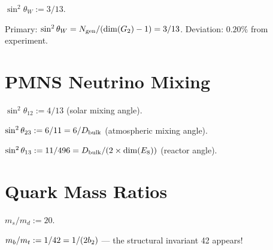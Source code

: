 \begin{definition}\label{def:sin2_theta_W_obs}
    \leanok
    $\sin^2\theta_W := 3/13$.
\end{definition}

\begin{theorem}\label{thm:sin2_theta_W_14}
    \leanok
    Primary: $\sin^2\theta_W = N_{\mathrm{gen}} / (\mathrm{dim}(G_2) - 1) = 3/13$.
    Deviation: $0.20\%$ from experiment.
\end{theorem}

\section{PMNS Neutrino Mixing}

\begin{definition}\label{def:theta12_pmns}
    \leanok
    $\sin^2\theta_{12} := 4/13$ (solar mixing angle).
\end{definition}

\begin{definition}\label{def:theta23_pmns}
    \leanok
    $\sin^2\theta_{23} := 6/11 = 6/D_{\mathrm{bulk}}$ (atmospheric mixing angle).
\end{definition}

\begin{definition}\label{def:theta13_pmns}
    \leanok
    $\sin^2\theta_{13} := 11/496 = D_{\mathrm{bulk}} / (2 \times \mathrm{dim}(E_8))$ (reactor angle).
\end{definition}

\section{Quark Mass Ratios}

\begin{definition}[$m_s/m_d$]\label{def:ms_md}
    \leanok
    $m_s / m_d := 20$.
\end{definition}

\begin{definition}[$m_b/m_t$]\label{def:mb_mt}
    \leanok
    $m_b / m_t := 1/42 = 1/(2b_2)$ --- the structural invariant 42 appears!
\end{definition}

